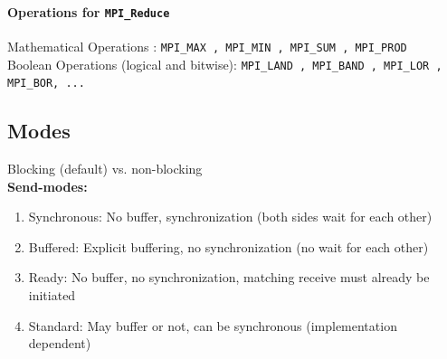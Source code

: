 \paragraph{Operations for \texttt{MPI\_Reduce}}
Mathematical Operations : \texttt{MPI\_MAX , MPI\_MIN , MPI\_SUM , MPI\_PROD} \\
Boolean Operations (logical and bitwise): \texttt{MPI\_LAND , MPI\_BAND , MPI\_LOR , MPI\_BOR, ...}\\

\subsection{Modes}

Blocking (default) vs. non-blocking\\

\textbf{Send-modes:}
\begin{enumerate}
	\item Synchronous: No buffer, synchronization (both sides wait for each other)
	\item Buffered:	Explicit buffering, no synchronization (no wait for each other)
	\item Ready: No buffer, no synchronization, matching receive must already be initiated
	\item Standard: May buffer or not, can be synchronous (implementation dependent)
\end{enumerate}




